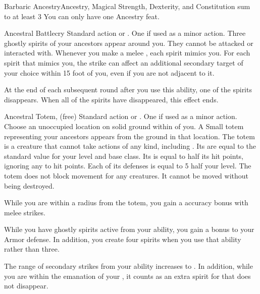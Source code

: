   \begin{magicalfeat}{Barbaric Ancestry}{Ancestry, Magical}
    \featpre Strength, Dexterity, and Constitution sum to at least 3
     You can only have one Ancestry feat.

    \begin{magicalactiveability}{Ancestral Battlecry}
      \abilityusagetime Standard action or .
      \abilitycost One  if used as a minor action.
      \rankline
      Three ghostly spirits of your ancestors appear around you.
      They cannot be attacked or interacted with.
      Whenever you make a melee , each spirit mimics you.
      For each spirit that mimics you, the strike can affect an additional secondary target of your choice within 15 foot  of you, even if you are not adjacent to it.

      At the end of each subsequent round after you use this ability, one of the spirits disappears.
      When all of the spirits have disappeared, this effect ends.
    \end{magicalactiveability}

    \begin{magicalsustainability}{Ancestral Totem}{,  (free)}
      \abilityusagetime Standard action or .
      \abilitycost One  if used as a minor action.
      \rankline
      Choose an unoccupied location on solid ground within \longrange of you.
      A Small totem representing your ancestors appears from the ground in that location.
      The totem is a creature that cannot take actions of any kind, including .
      Its  are equal to the standard value for your level and base class.
      Its  is equal to half its hit points, ignoring any  to hit points.
      Each of its defenses is equal to 5 \add half your level.
      The totem does not block movement for any creatures.
      It cannot be moved without being destroyed.

      While you are within a \medarea radius  from the totem, you gain a  accuracy bonus with melee strikes.
    \end{magicalsustainability}

     While you have ghostly spirits active from your  ability, you gain a  bonus to your Armor defense.
    In addition, you create four spirits when you use that ability rather than three.

     The range of secondary strikes from your  ability increases to \shortrange.
    In addition, while you are within the emanation of your , it counts as an extra spirit for  that does not disappear.
  \end{magicalfeat}

